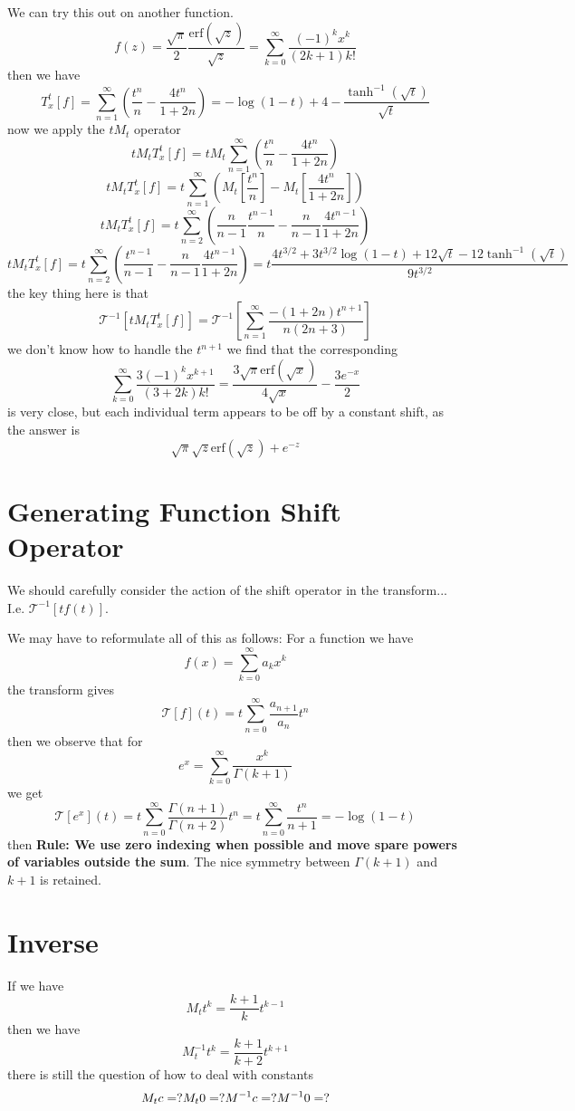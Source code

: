 \documentclass{article}
\begin{document}
We can try this out on another function.
$$
f(z) = \frac{\sqrt{\pi}}{2}\frac{\mathrm{erf}(\sqrt{z})}{\sqrt{z}} = \sum_{k=0}^\infty \frac{(-1)^k x^k}{(2k+1)k!}
$$
then we have 
$$
T_x^t[f] = \sum_{n=1}^\infty \left(\frac{t^n}{n} - \frac{4 t^n}{1+2n}\right) = - \log(1-t) + 4 - \frac{\tanh^{-1}(\sqrt{t})}{\sqrt{t}}
$$
now we apply the $t M_t$ operator
$$
t M_t T_x^t[f] = t M_t \sum_{n=1}^\infty \left(\frac{t^n}{n} - \frac{4 t^n}{1+2n}\right)
$$
$$
t M_t T_x^t[f] =  t\sum_{n=1}^\infty \left( M_t[\frac{t^n}{n}] - M_t[\frac{4 t^n}{1+2n}]\right)
$$
$$
t M_t T_x^t[f] =  t \sum_{n=2}^\infty \left( \frac{n}{n-1}\frac{t^{n-1}}{n} - \frac{n}{n-1}\frac{4 t^{n-1}}{1+2n}\right)
$$
$$
t M_t T_x^t[f] =  t \sum_{n=2}^\infty \left( \frac{t^{n-1}}{n-1} - \frac{n}{n-1}\frac{4 t^{n-1}}{1+2n}\right) = t \frac{4 t^{3/2}+3 t^{3/2} \log (1-t)+12 \sqrt{t}-12
    \tanh ^{-1}\left(\sqrt{t}\right)}{9 t^{3/2}}
$$
the key thing here is that
$$
\mathcal{T}^{-1}[t M_t T_x^t[f]] = \mathcal{T}^{-1}[\sum_{n=1}^\infty \frac{-(1+2n)t^{n+1}}{n(2n+3)}]
$$
we don't know how to handle the $t^{n+1}$ we find that the corresponding 
$$
\sum_{k=0}^\infty \frac{3 (-1)^k x^{k+1}}{(3+2k)k!} =   \frac{3 \sqrt{\pi } \text{erf}\left(\sqrt{x}\right)}{4 \sqrt{x}}-\frac{3
    e^{-x}}{2}
$$
is very close, but each individual term appears to be off by a constant shift, as the answer is 
$$
\sqrt{\pi } \sqrt{z} \text{erf}\left(\sqrt{z}\right)+e^{-z}
$$

\section{Generating Function Shift Operator}
We should carefully consider the action of the shift operator in the transform... I.e. $\mathcal{T}^{-1}[t f(t)]$.

We may have to reformulate all of this as follows:
For a function we have 
$$
f(x) = \sum_{k=0}^\infty a_k x^k
$$
the transform gives
$$
\mathcal{T}[f](t) = t \sum_{n=0}^\infty \frac{a_{n+1}}{a_n}t^n
$$
then we observe that for
$$
e^x = \sum_{k=0}^\infty \frac{x^k}{\Gamma(k+1)}
$$
we get
$$
\mathcal{T}[e^x](t) = t \sum_{n=0}^\infty \frac{\Gamma(n+1)}{\Gamma(n+2)} t^n = t \sum_{n=0}^\infty \frac{t^n}{n+1} = -\log(1-t)
$$
then \textbf{Rule: We use zero indexing when possible and move spare powers of variables outside the sum}. The nice symmetry between $\Gamma(k+1)$ and $k+1$ is retained.


\section{Inverse}
If we have 
$$
M_t t^k = \frac{k+1}{k}t^{k-1}
$$
then we have 
$$
M_t^{-1} t^k = \frac{k+1}{k+2}t^{k+1}
$$
there is still the question of how to deal with constants
$$
M_t c =? \\
M_t 0 = ? \\
M^{-1} c = ? \\
M^{-1} 0 = ?
$$
\end{document}
